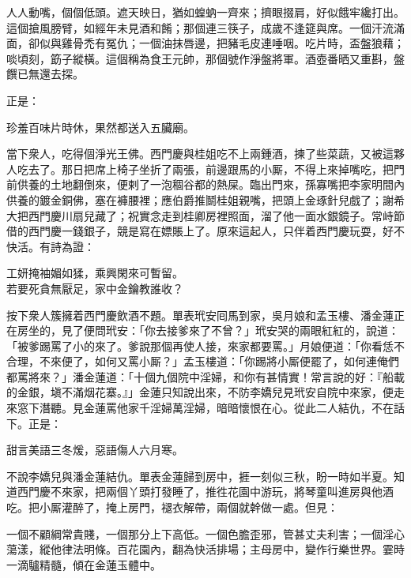 \begin{myquote}
人人動嘴，個個低頭。遮天映日，猶如蝗蚋一齊來；擠眼掇肩，好似餓牢纔打出。這個搶風膀臂，如經年未見酒和餚；那個連三筷子，成歲不逢筵與席。一個汗流滿面，卻似與雞骨禿有冤仇；一個油抹唇邊，把豬毛皮連唾咽。吃片時，盃盤狼藉；啖頃刻，筯子縱橫。這個稱為食王元帥，那個號作淨盤將軍。酒壺番晒又重斟，盤饌已無還去探。
\end{myquote}

正是：

\begin{myquote}
珍羞百味片時休，果然都送入五臟廟。{}
\end{myquote}

當下衆人，吃得個淨光王佛。西門慶與桂姐吃不上兩鍾酒，揀了些菜蔬，又被這夥人吃去了。那日把席上椅子坐折了兩張，前邊跟馬的小厮，不得上來掉嘴吃，把門前供養的土地翻倒來，便剌了一泡稒谷都的熱屎。{}臨出門來，孫寡嘴把李家明間內供養的鍍金銅佛，塞在褲腰裡；應伯爵推鬬桂姐親嘴，把頭上金琢針兒戲了；謝希大把西門慶川扇兒藏了；祝實念走到桂卿房裡照面，溜了他一面水銀鏡子。常峙節借的西門慶一錢銀子，競是寫在嫖賬上了。原來這起人，只伴着西門慶玩耍，好不快活。有詩為證：

\begin{myquote}
工妍掩袖媚如猱，乘興閑來可暫留。\\若要死貪無厭足，家中金鑰教誰收？
\end{myquote}

按下衆人簇擁着西門慶飲酒不題。單表玳安囘馬到家，吳月娘和孟玉樓、潘金蓮正在房坐的，見了便問玳安：「你去接爹來了不曾？」玳安哭的兩眼紅紅的，說道：「被爹踢罵了小的來了。爹說那個再使人接，來家都要罵。」月娘便道：「你看恁不合理，不來便了，如何又罵小厮？」孟玉樓道：「你踢將小厮便罷了，如何連俺們都罵將來？」潘金蓮道：「十個九個院中淫婦，和你有甚情實！常言說的好：『船載的金銀，塡不滿烟花寨。』」金蓮只知說出來，不防李嬌兒見玳安自院中來家，便走來窓下潛聽。見金蓮罵他家千淫婦萬淫婦，暗暗懷恨在心。從此二人結仇，不在話下。正是：

\begin{myquote}
甜言美語三冬煖，惡語傷人六月寒。
\end{myquote}

不說李嬌兒與潘金蓮結仇。單表金蓮歸到房中，捱一刻似三秋，盼一時如半夏。知道西門慶不來家，把兩個丫頭打發睡了，推徃花園中游玩，將琴童叫進房與他酒吃。把小厮灌醉了，{}掩上房門，褪衣解帶，兩個就幹做一處。但見：

\begin{myquote}
一個不顧綱常貴賤，一個那分上下高低。一個色膽歪邪，管甚丈夫利害；一個淫心蕩漾，縱他律法明條。百花園內，翻為快活排場；主母房中，變作行樂世界。霎時一滴驢精髓，{}傾在金蓮玉體中。
\end{myquote}

